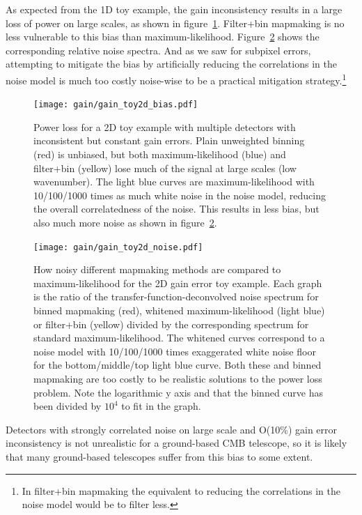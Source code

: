 \documentclass[twocolumn,apj]{aastex63}
\begin{document}
As expected from the 1D toy example, the gain inconsistency results
in a large loss of power on large scales, as shown in figure~\ref{fig:gain-tf-2d}.
Filter+bin mapmaking is no less vulnerable to this bias than maximum-likelihood.
Figure~\ref{fig:gain-noise-2d} shows the corresponding relative noise spectra.
And as we saw for subpixel errors, attempting to mitigate the bias by
artificially reducing the correlations in the noise model is much too
costly noise-wise to be a practical mitigation strategy.\footnote{In filter+bin
mapmaking the equivalent to reducing the correlations in the noise model would be
to filter less.}
\begin{figure}
	\centering
	\texttt{[image: gain/gain\_toy2d\_bias.pdf]}
	\caption{Power loss for a 2D toy example with multiple detectors
	with inconsistent but constant gain errors. Plain unweighted binning
	(red) is unbiased, but both maximum-likelihood (blue) and filter+bin
	(yellow) lose much of the signal at large scales (low wavenumber).
	The light blue curves are maximum-likelihood with 10/100/1000 times
	as much white noise in the noise model, reducing the overall correlatedness of the noise.
	This results in less bias, but also much more noise as shown in figure~\ref{fig:gain-noise-2d}.}
	\label{fig:gain-tf-2d}
\end{figure}
\begin{figure}
	\centering
	\texttt{[image: gain/gain\_toy2d\_noise.pdf]}
	\caption{How noisy different mapmaking methods are compared to maximum-likelihood
	for the 2D gain error toy example. Each graph is the ratio of the transfer-function-deconvolved
	noise spectrum for binned mapmaking (red), whitened maximum-likelihood (light blue)
	or filter+bin (yellow) divided by the corresponding spectrum for standard maximum-likelihood.
	The whitened curves correspond to a noise model with 10/100/1000 times exaggerated
	white noise floor for the bottom/middle/top light blue curve. Both these and binned mapmaking
	are too costly to be realistic solutions to the power loss problem. Note the logarithmic
	y axis and that the binned curve has been divided by $10^4$ to fit in the graph.}
	\label{fig:gain-noise-2d}
\end{figure}

Detectors with strongly correlated noise on large scale and O(10\%) gain
error inconsistency is not unrealistic for a ground-based CMB telescope,
so it is likely that many ground-based telescopes suffer from this bias to
some extent.
\end{document}
